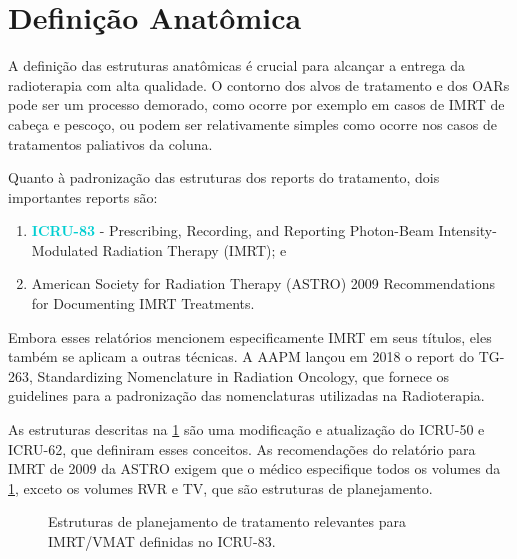 \documentclass[11pt,a4paper]{article}
\newcounter{exemplo}
\begin{document}
\section{Definição Anatômica}

	A definição das estruturas anatômicas é crucial para alcançar a entrega da radioterapia com alta qualidade. O contorno dos alvos de tratamento e dos OARs pode ser um processo demorado, como ocorre por exemplo em casos de IMRT de cabeça e pescoço, ou podem ser relativamente simples como ocorre nos casos de tratamentos paliativos da coluna. 

	Quanto à padronização das estruturas dos reports do tratamento, dois importantes reports são:

	\begin{enumerate}
		\item \textcolor{DarkTurquoise}{\textbf{ICRU-83}} - Prescribing, Recording, and Reporting Photon-Beam Intensity-Modulated Radiation Therapy (IMRT); e
		\item American Society for Radiation Therapy (ASTRO) 2009 Recommendations for Documenting IMRT 
		Treatments.
	\end{enumerate}

	Embora esses relatórios mencionem especificamente IMRT em seus títulos, eles também se aplicam a outras técnicas. A AAPM lançou em 2018 o report do TG-263, Standardizing Nomenclature in Radiation Oncology, que fornece os guidelines para a padronização das nomenclaturas utilizadas na Radioterapia. 

	As estruturas descritas na \ref{fig:estruturasIcru83} são uma modificação e atualização do ICRU-50 e ICRU-62, que definiram esses conceitos. As recomendações do relatório para IMRT de 2009 da ASTRO exigem que o médico especifique todos os volumes da \ref{fig:estruturasIcru83}, exceto os volumes RVR e TV, que são estruturas de planejamento.

	\begin{figure}[h]
		\centering
		\caption{Estruturas de planejamento de tratamento relevantes para IMRT/VMAT definidas no ICRU-83.}
		\label{fig:estruturasIcru83}
	\end{figure}
\end{document}
